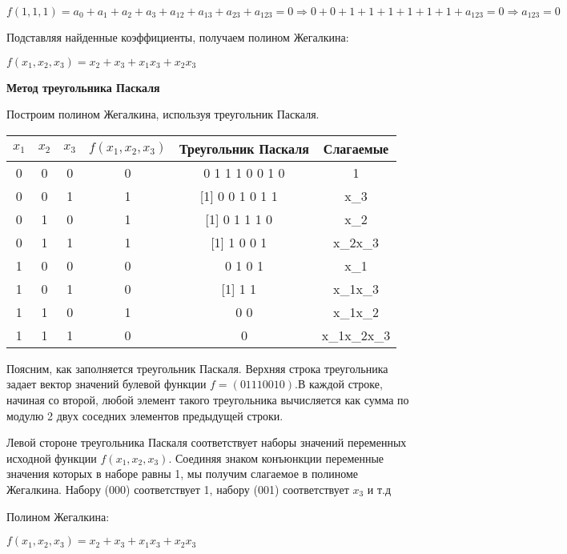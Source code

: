\documentclass[11pt]{article}
\begin{document}
$f(1,1,1)=a_0 + a_1 + a_2 + a_3 + a_{12} + a_{13} + a_{23} + a_{123}=0 \Rightarrow 0 + 0 + 1 + 1 + 1 + 1 + 1 + 1 + a_{123} = 0 \Rightarrow a_{123}=0$

Подставляя найденные коэффициенты, получаем полином Жегалкина:

$f(x_1,x_2,x_3)= x_2 + x_3 + x_1x_3 + x_2x_3$

\textbf{Метод треугольника Паскаля}

Построим полином Жегалкина, используя треугольник Паскаля.

\begin{center}
        \begin{tabular}{ |c|c|c|c|c|c| }
                \hline
				$x_1$ & $x_2$ & $x_3$ & $f(x_1,x_2,x_3)$ & Треугольник Паскаля & Слагаемые\\
                \hline
				0 & 0 & 0 & 0 & 0 1 1 1 0 0 1 0 & 1\\
                \hline
				0 & 0 & 1 & 1 &[1] 0 0 1 0 1 1 \ & x_3\\
                \hline
				0 & 1 & 0 & 1 & [1] 0 1 1 1 0 \ & x_2\\
                \hline
				0 & 1 & 1 & 1 & [1] 1 0 0 1 \ & x_2x_3\\
                \hline
				1 & 0 & 0 & 0 & 0 1 0 1 & x_1\\
                \hline
				1 & 0 & 1 & 0 & [1] 1 1 \ & x_1x_3\\
                \hline
				1 & 1 & 0 & 1 & 0 0 & x_1x_2\\
                \hline
				1 & 1 & 1 & 0 & 0 & x_1x_2x_3\\
                \hline
        \end{tabular}
\end{center}

Поясним, как заполняется треугольник Паскаля. Верхняя строка
треугольника задает вектор значений булевой функции $f=(01110010)$.В каждой
строке, начиная со второй, любой элемент такого треугольника вычисляется
как сумма по модулю 2 двух соседних элементов предыдущей строки.

Левой стороне треугольника Паскаля соответствует наборы значений
переменных исходной функции $f(x_1,x_2,x_3)$. Соединяя знаком конъюнкции
переменные значения которых в наборе равны 1, мы получим слагаемое в
полиноме Жегалкина. Набору (000) соответствует 1, набору (001) соответствует $x_3$
и т.д

Полином Жегалкина:

$f(x_1,x_2,x_3)= x_2 + x_3 + x_1x_3 + x_2x_3$
\end{document}
